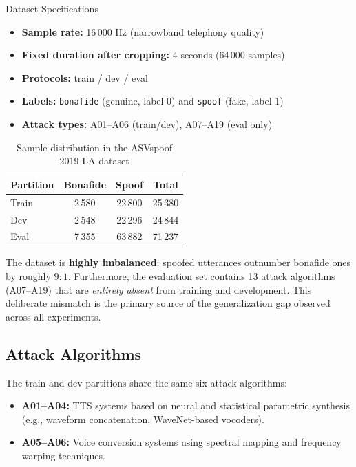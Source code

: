 \documentclass[12pt]{report}
\begin{document}
\begin{genbox}{Dataset Specifications}
\begin{itemize}[noitemsep]
    \item \textbf{Sample rate:} 16\,000 Hz (narrowband telephony quality)
    \item \textbf{Fixed duration after cropping:} 4 seconds (64\,000 samples)
    \item \textbf{Protocols:} train / dev / eval
    \item \textbf{Labels:} \texttt{bonafide} (genuine, label 0) and \texttt{spoof} (fake, label 1)
    \item \textbf{Attack types:} A01--A06 (train/dev), A07--A19 (eval only)
\end{itemize}
\end{genbox}

\begin{table}[h!]
\centering
\caption{Sample distribution in the ASVspoof 2019 LA dataset}
\label{tab:dataset}
\begin{tabularx}{0.82\textwidth}{lccc}
\toprule
\textbf{Partition} & \textbf{Bonafide} & \textbf{Spoof} & \textbf{Total} \\
\midrule
Train & 2\,580  & 22\,800 & 25\,380 \\
Dev   & 2\,548  & 22\,296 & 24\,844 \\
Eval  & 7\,355  & 63\,882 & 71\,237 \\
\bottomrule
\end{tabularx}
\end{table}

\begin{notebox}
    The dataset is \textbf{highly imbalanced}: spoofed utterances outnumber bonafide ones by
    roughly $9{:}1$. Furthermore, the evaluation set contains 13 attack algorithms (A07--A19)
    that are \emph{entirely absent} from training and development. This deliberate mismatch
    is the primary source of the generalization gap observed across all experiments.
\end{notebox}

\subsection{Attack Algorithms}

The train and dev partitions share the same six attack algorithms:
\begin{itemize}[noitemsep]
    \item \textbf{A01--A04:} TTS systems based on neural and statistical parametric synthesis
          (e.g., waveform concatenation, WaveNet-based vocoders).
    \item \textbf{A05--A06:} Voice conversion systems using spectral mapping and frequency
          warping techniques.
\end{itemize}
\end{document}
